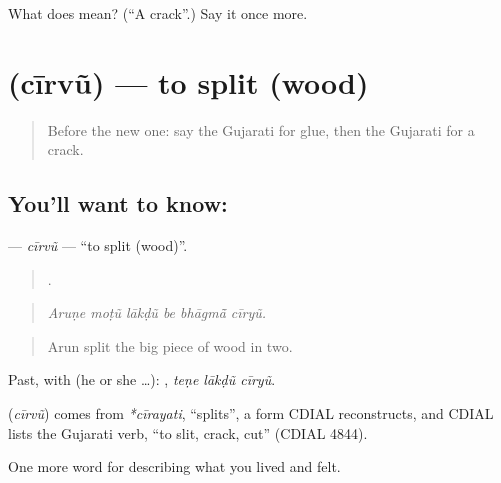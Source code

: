 \begin{tcolorbox}[breakable,colback=teal!4,colframe=teal!35!black,title={Before you move on}]
What does  mean? (\textquotedblleft{}A crack\textquotedblright{}.) Say it once more.
\end{tcolorbox}
\section[\texorpdfstring{\gu{ચીરવું} (cīrvũ)}{ચીરવું (cīrvũ)}]{ (cīrvũ) — to split (wood)}

\label{lesson:GU-C503-cirvu}



\begin{quote}
Before the new one: say the Gujarati for glue, then the Gujarati for a crack.
\end{quote}

\subsection*{You'll want to know: }
\textbf{} — \emph{cīrvũ} — \textquotedblleft{}to split (wood)\textquotedblright{}.

\begin{quote}
     .
\end{quote}

\begin{quote}
\emph{Aruṇe moṭũ lākḍũ be bhāgmā̃ cīryũ.}
\end{quote}

\begin{quote}
Arun split the big piece of wood in two.
\end{quote}

Past, with  (he or she …):   , \emph{teṇe lākḍũ cīryũ}.

\begin{cousinweb}
\textbf{} (\emph{cīrvũ}) comes from \emph{*cīrayati}, \textquotedblleft{}splits\textquotedblright{}, a form CDIAL reconstructs, and CDIAL lists the Gujarati verb, \textquotedblleft{}to slit, crack, cut\textquotedblright{} (CDIAL 4844).
\end{cousinweb}

\begin{grammarlens}[title={What you've built}]
One more word for describing what you lived and felt.
\end{grammarlens}

